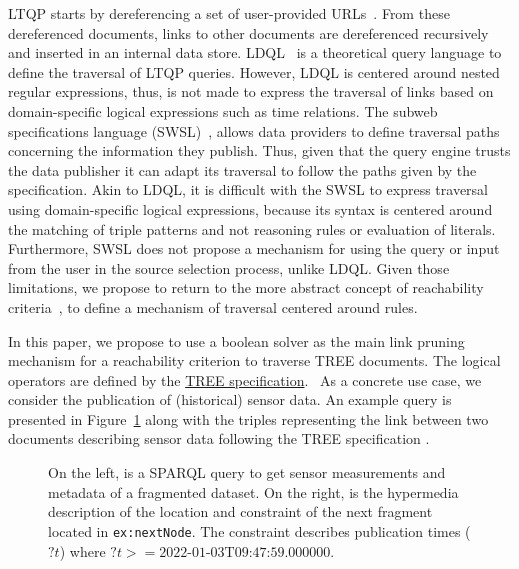LTQP starts by dereferencing a set of user-provided URLs~\cite{Hartig2016}.
From these dereferenced documents, links to other documents are dereferenced recursively and inserted in an internal data store.
LDQL~\cite{hartig2016Ldql} is a theoretical query language to define the traversal of LTQP queries.
However, LDQL is centered around nested regular expressions, thus, is not made to express the traversal of links based on domain-specific logical expressions
such as time relations.
The subweb specifications language (SWSL)~\cite{bogaerts_rulemlrr_2021}, allows data providers to define traversal paths concerning the information they publish.
Thus, given that the query engine trusts the data publisher it can adapt its traversal to follow the paths given by the specification.
Akin to LDQL, it is difficult with the SWSL to express traversal using domain-specific logical expressions, because its syntax is centered around the matching of triple patterns and not reasoning rules or evaluation of literals.
Furthermore, SWSL does not propose a mechanism for using the query or input from the user in the source selection process, unlike LDQL.
Given those limitations, we propose to return to the more abstract concept of reachability criteria~\cite{hartig2012},
to define a mechanism of traversal centered around rules.

In this paper, we propose to use a boolean solver as the main link pruning mechanism for a reachability criterion to traverse TREE documents.
The logical operators are defined by the \href{https://treecg.github.io/specification/}{TREE specification}.~
As a concrete use case, we consider the publication of (historical) sensor data.
An example query is presented in Figure~\ref{lst:system} along with the triples representing the link between two documents describing sensor data following the TREE specification .

\begin{figure}[h]
    \begin{minipage}{0.50\textwidth}
        \centering
        
    \end{minipage}
    \hspace{0.05\textwidth}
    \begin{minipage}{0.43\textwidth}
        \centering
        
    \end{minipage}
    \caption{On the left, is a SPARQL query to get sensor measurements and metadata of a fragmented dataset.
    On the right, is the hypermedia description of the location and constraint of the next fragment located in \texttt{ex:nextNode}.
    The constraint describes publication times ($?t$) where $?t>= \text{2022-01-03T09:47:59.000000}$.}
        \label{lst:system}
    \vspace*{-0.90cm}
\end{figure}